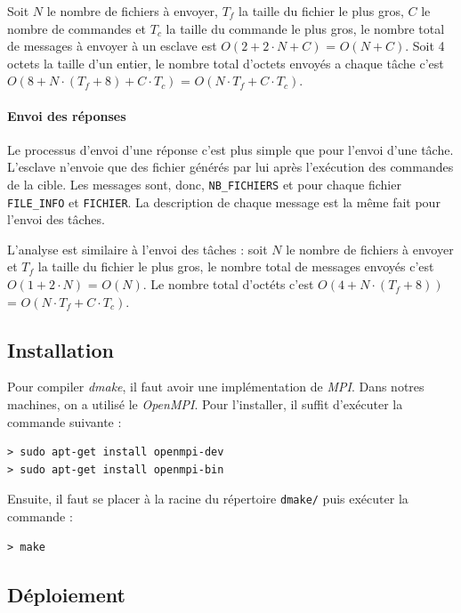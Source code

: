 \documentclass[a4paper,12pt,twoside]{article}
\begin{document}
Soit \texttt{$N$} le nombre de fichiers à envoyer, \texttt{$T_f$} la taille du fichier le plus gros, \texttt{$C$} le nombre de commandes et \texttt{$T_c$} la taille du commande le plus gros, le nombre total de messages à envoyer à un esclave est \texttt{$O(2 + 2 \cdot N + C)$} = \texttt{$O(N + C)$}. Soit 4 octets la taille d'un entier, le nombre total d'octets envoyés a chaque tâche c'est \texttt{$O(8 + N \cdot (T_f+8) + C \cdot T_c)$} = \texttt{$O(N \cdot T_f + C \cdot T_c)$}.

\paragraph{Envoi des réponses}
Le processus d'envoi d'une réponse c'est plus simple que pour l'envoi d'une tâche. L'esclave n'envoie que des fichier générés par lui après l'exécution des commandes de la cible. Les messages sont, donc, \texttt{NB\_FICHIERS} et pour chaque fichier \texttt{FILE\_INFO} et \texttt{FICHIER}. La description de chaque message est la même fait pour l'envoi des tâches.

L'analyse est similaire à l'envoi des tâches : soit \texttt{$N$} le nombre de fichiers à envoyer et \texttt{$T_f$} la taille du fichier le plus gros, le nombre total de messages envoyés c'est \texttt{$O(1 + 2 \cdot N)$} = \texttt{$O(N)$}. Le nombre total d'octéts c'est \texttt{$O(4 + N \cdot (T_f+8))$} = \texttt{$O(N \cdot T_f + C \cdot T_c)$}.

\subsection{Installation}

Pour compiler \emph{dmake}, il faut avoir une implémentation de \emph{MPI}.
Dans notres machines, on a utilisé le \emph{OpenMPI}. Pour l'installer, il
suffit d'exécuter la commande suivante :
\begin{verbatim}
> sudo apt-get install openmpi-dev
> sudo apt-get install openmpi-bin
\end{verbatim}

Ensuite, il faut se placer à la racine du
répertoire \texttt{dmake/} puis exécuter la commande :
\begin{verbatim}
> make
\end{verbatim}

\subsection{Déploiement}
\end{document}
